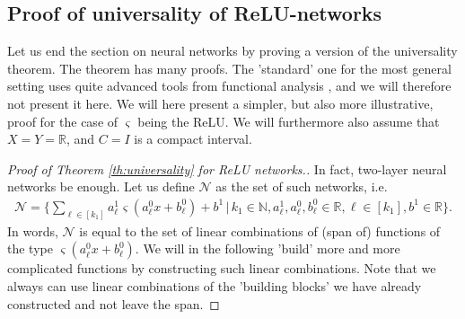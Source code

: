 \documentclass{article}
\newcommand{\calN}{\mathcal{N}}
\newcommand{\R}{\mathbb{R}}
\newcommand{\N}{\mathbb{N}}
\begin{document}
\subsection{Proof of universality of ReLU-networks} Let us end the section on neural networks by proving a version of the universality theorem. The theorem has many proofs. The 'standard' one for the most general setting uses quite advanced tools from functional analysis \cite{hornik1989multilayer}, and we will therefore not present it here. We will here present a simpler, but also more illustrative, proof for the case of $\varsigma$ being the ReLU. We will furthermore also assume that $X=Y=\R$, and $C=I$ is a compact interval.

\begin{proof}[Proof of Theorem \ref{th:universality} for ReLU networks.]
    In fact, two-layer neural networks be enough. Let us define $\calN$ as the set of such networks, i.e.
    \begin{align*}
        \calN = \{\sum_{\ell \in [k_1]} a_\ell^1\varsigma(a_\ell^0 x + b_\ell^0) + b^1 \, \vert \, k_1 \in \N, a_\ell^1, a_\ell^0, b_\ell^0 \in \R, \ell \in [k_1], b^1 \in \R\}.
    \end{align*}
    In words, $\calN$ is equal to the set of linear combinations of (span of) functions of the type $\varsigma(a_\ell^0 x + b_\ell^0)$. We will in the following 'build' more and more complicated functions by constructing such linear combinations. Note that we always can use linear combinations of the 'building blocks' we have already constructed and not leave the span. 


\end{proof}
\end{document}
